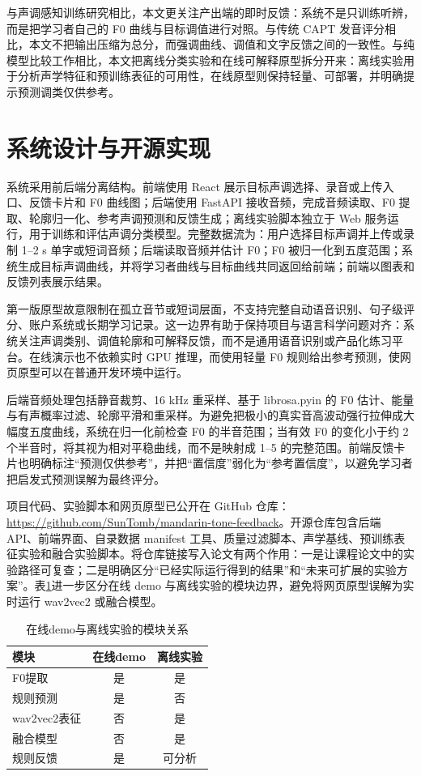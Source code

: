 \documentclass[UTF8,a4paper,twocolumn]{ctexart}
\begin{document}
与声调感知训练研究相比，本文更关注产出端的即时反馈：系统不是只训练听辨，而是把学习者自己的 F0 曲线与目标调值进行对照。与传统 CAPT 发音评分相比，本文不把输出压缩为总分，而强调曲线、调值和文字反馈之间的一致性。与纯模型比较工作相比，本文把离线分类实验和在线可解释原型拆分开来：离线实验用于分析声学特征和预训练表征的可用性，在线原型则保持轻量、可部署，并明确提示预测调类仅供参考。

\section{系统设计与开源实现}

系统采用前后端分离结构。前端使用 React 展示目标声调选择、录音或上传入口、反馈卡片和 F0 曲线图；后端使用 FastAPI 接收音频，完成音频读取、F0 提取、轮廓归一化、参考声调预测和反馈生成；离线实验脚本独立于 Web 服务运行，用于训练和评估声调分类模型。完整数据流为：用户选择目标声调并上传或录制 1--2 s 单字或短词音频；后端读取音频并估计 F0；F0 被归一化到五度范围；系统生成目标声调曲线，并将学习者曲线与目标曲线共同返回给前端；前端以图表和反馈列表展示结果。

第一版原型故意限制在孤立音节或短词层面，不支持完整自动语音识别、句子级评分、账户系统或长期学习记录。这一边界有助于保持项目与语言科学问题对齐：系统关注声调类别、调值轮廓和可解释反馈，而不是通用语音识别或产品化练习平台。在线演示也不依赖实时 GPU 推理，而使用轻量 F0 规则给出参考预测，使网页原型可以在普通开发环境中运行。

后端音频处理包括静音裁剪、16 kHz 重采样、基于 librosa.pyin 的 F0 估计、能量与有声概率过滤、轮廓平滑和重采样\cite{librosa}。为避免把极小的真实音高波动强行拉伸成大幅度五度曲线，系统在归一化前检查 F0 的半音范围；当有效 F0 的变化小于约 2 个半音时，将其视为相对平稳曲线，而不是映射成 1--5 的完整范围。前端反馈卡片也明确标注“预测仅供参考”，并把“置信度”弱化为“参考置信度”，以避免学习者把启发式预测误解为最终评分。

项目代码、实验脚本和网页原型已公开在 GitHub 仓库：\url{https://github.com/SunTomb/mandarin-tone-feedback}。开源仓库包含后端 API、前端界面、自录数据 manifest 工具、质量过滤脚本、声学基线、预训练表征实验和融合实验脚本。将仓库链接写入论文有两个作用：一是让课程论文中的实验路径可复查；二是明确区分“已经实际运行得到的结果”和“未来可扩展的实验方案”。表\ref{tab:online-offline}进一步区分在线 demo 与离线实验的模块边界，避免将网页原型误解为实时运行 wav2vec2 或融合模型。

\begin{table}[t]
\centering
\caption{在线demo与离线实验的模块关系}
\label{tab:online-offline}
\begin{tabular}{lcc}
\toprule
模块 & 在线demo & 离线实验 \\
\midrule
F0提取 & 是 & 是 \\
规则预测 & 是 & 否 \\
wav2vec2表征 & 否 & 是 \\
融合模型 & 否 & 是 \\
规则反馈 & 是 & 可分析 \\
\bottomrule
\end{tabular}
\end{table}
\end{document}
